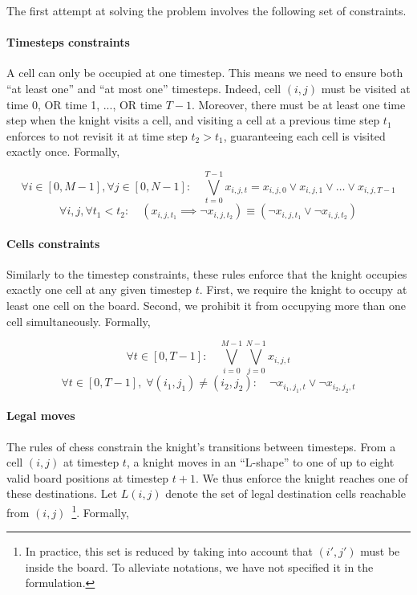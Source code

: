 \documentclass[a4paper, 11pt]{article}
\begin{document}
The first attempt at solving the problem involves the following set of constraints.

\paragraph{Timesteps constraints} 
A cell can only be occupied at one timestep. This means we need to ensure both  ``at least one'' and ``at most one'' timesteps. Indeed, cell $(i,j)$ must be visited at time 0, OR time 1, ..., OR time $T-1$. Moreover, there must be at least one time step when the knight visits a cell, and visiting a cell at a previous time step $t_1$ enforces to not revisit it at time step $t_2 > t_1$, guaranteeing each cell is visited exactly once. Formally,

\begin{equation}
    \forall i \in [0, M-1], \forall j \in [0, N-1] : \quad \bigvee_{t=0}^{T-1} x_{i,j,t} = x_{i,j,0} \vee x_{i,j,1} \vee \dots \vee x_{i,j,T-1}
\end{equation}
\begin{equation}
    \forall i, j, \forall t_1 < t_2 : \quad (x_{i,j,t_1} \implies \neg x_{i,j,t_2}) \equiv (\neg x_{i,j,t_1} \vee \neg x_{i,j,t_2})
\end{equation}

\paragraph{Cells constraints}
Similarly to the timestep constraints, these rules enforce that the knight occupies exactly one cell at any given timestep $t$. First, we require the knight to occupy at least one cell on the board. Second, we prohibit it from occupying more than one cell simultaneously. Formally,

\begin{equation}
    \forall t \in [0, T-1] : \quad \bigvee_{i=0}^{M-1} \bigvee_{j=0}^{N-1} x_{i,j,t}
\end{equation}
\begin{equation}
    \forall t \in [0, T-1], \; \forall (i_1, j_1) \neq (i_2, j_2) : \quad \neg x_{i_1,j_1,t} \vee \neg x_{i_2,j_2,t}
\end{equation}

\paragraph{Legal moves} 
The rules of chess constrain the knight's transitions between timesteps. From a cell $(i, j)$ at timestep $t$, a knight moves in an ``L-shape'' to one of up to eight valid board positions at timestep $t+1$. We thus enforce the knight reaches one of these destinations. Let $L(i, j)$ denote the set of legal destination cells reachable from $(i, j)$~\footnote{In practice, this set is reduced by taking into account that $(i', j')$ must be inside the board. To alleviate notations, we have not specified it in the formulation.}. Formally,
\end{document}

